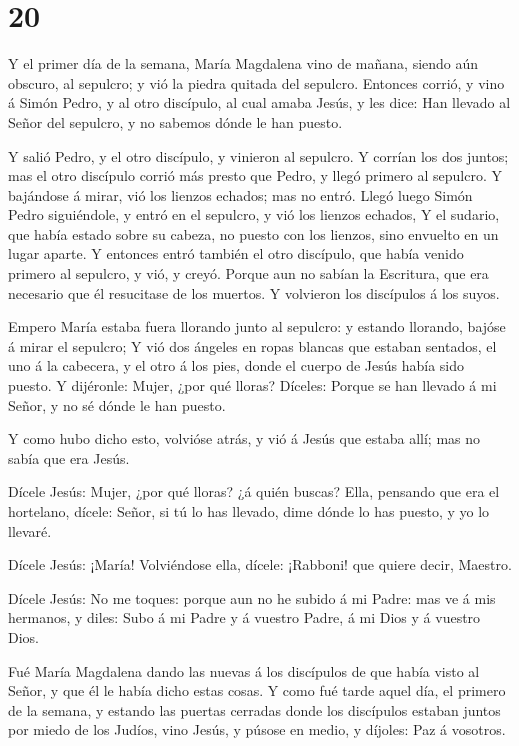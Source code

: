 \hypertarget{section-19}{%
\section{20}\label{section-19}}

 Y el primer día de la semana, María Magdalena vino de
mañana, siendo aún obscuro, al sepulcro; y vió la piedra quitada del
sepulcro.  Entonces corrió, y vino á Simón Pedro, y al otro
discípulo, al cual amaba Jesús, y les dice: Han llevado al Señor del
sepulcro, y no sabemos dónde le han puesto.

 Y salió Pedro, y el otro discípulo, y vinieron al sepulcro.
 Y corrían los dos juntos; mas el otro discípulo corrió más
presto que Pedro, y llegó primero al sepulcro.  Y bajándose
á mirar, vió los lienzos echados; mas no entró.  Llegó luego
Simón Pedro siguiéndole, y entró en el sepulcro, y vió los lienzos
echados,  Y el sudario, que había estado sobre su cabeza, no
puesto con los lienzos, sino envuelto en un lugar aparte.  Y
entonces entró también el otro discípulo, que había venido primero al
sepulcro, y vió, y creyó.  Porque aun no sabían la
Escritura, que era necesario que él resucitase de los muertos.
 Y volvieron los discípulos á los suyos.

 Empero María estaba fuera llorando junto al sepulcro: y
estando llorando, bajóse á mirar el sepulcro;  Y vió dos
ángeles en ropas blancas que estaban sentados, el uno á la cabecera, y
el otro á los pies, donde el cuerpo de Jesús había sido puesto.
 Y dijéronle: Mujer, ¿por qué lloras? Díceles: Porque se
han llevado á mi Señor, y no sé dónde le han puesto.

 Y como hubo dicho esto, volvióse atrás, y vió á Jesús que
estaba allí; mas no sabía que era Jesús.

 Dícele Jesús: Mujer, ¿por qué lloras? ¿á quién buscas?
Ella, pensando que era el hortelano, dícele: Señor, si tú lo has
llevado, dime dónde lo has puesto, y yo lo llevaré.

 Dícele Jesús: ¡María! Volviéndose ella, dícele: ¡Rabboni!
que quiere decir, Maestro.

 Dícele Jesús: No me toques: porque aun no he subido á mi
Padre: mas ve á mis hermanos, y diles: Subo á mi Padre y á vuestro
Padre, á mi Dios y á vuestro Dios.

 Fué María Magdalena dando las nuevas á los discípulos de
que había visto al Señor, y que él le había dicho estas cosas.
 Y como fué tarde aquel día, el primero de la semana, y
estando las puertas cerradas donde los discípulos estaban juntos por
miedo de los Judíos, vino Jesús, y púsose en medio, y díjoles: Paz á
vosotros.

